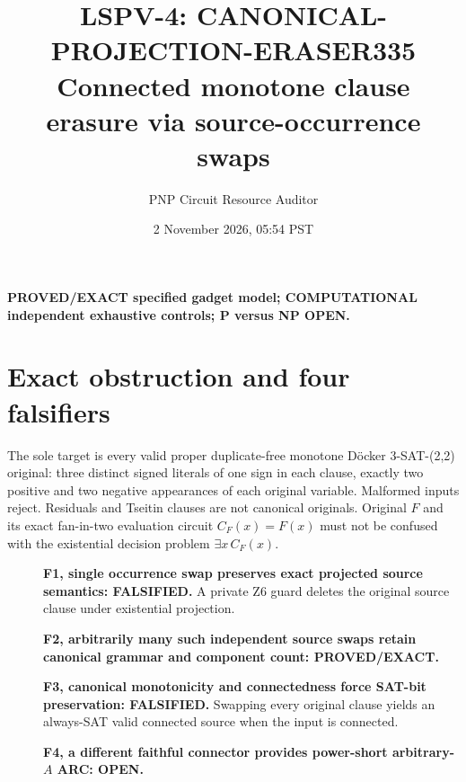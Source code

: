 \documentclass[11pt]{article}
\title{LSPV-4: CANONICAL-PROJECTION-ERASER335\\Connected monotone clause erasure via source-occurrence swaps}
\author{PNP Circuit Resource Auditor}
\date{2 November 2026, 05:54 PST}
\begin{document}
\maketitle
\noindent\textbf{PROVED/EXACT specified gadget model; COMPUTATIONAL independent exhaustive controls; P versus NP OPEN.}
\section{Exact obstruction and four falsifiers}
The sole target is every valid proper duplicate-free monotone D\"ocker 3-SAT-(2,2) original: three distinct signed literals of one sign in each clause, exactly two positive and two negative appearances of each original variable. Malformed inputs reject. Residuals and Tseitin clauses are not canonical originals. Original $F$ and its exact fan-in-two evaluation circuit $C_F(x)=F(x)$ must not be confused with the existential decision problem $\exists x\,C_F(x)$.
\begin{description}
\item[] \textbf{F1, single occurrence swap preserves exact projected source semantics: FALSIFIED.} A private Z6 guard deletes the original source clause under existential projection.
\item[] \textbf{F2, arbitrarily many such independent source swaps retain canonical grammar and component count: PROVED/EXACT.}
\item[] \textbf{F3, canonical monotonicity and connectedness force SAT-bit preservation: FALSIFIED.} Swapping every original clause yields an always-SAT valid connected source when the input is connected.
\item[] \textbf{F4, a different faithful connector provides power-short arbitrary-$A$ ARC: OPEN.}
\end{description}
\end{document}
